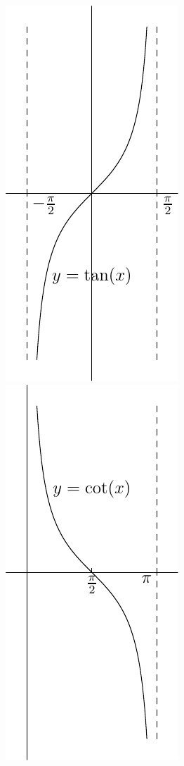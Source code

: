 \documentclass[UTTF8, fontset=ubuntu]{ctexart}
\begin{document}
\begin{figure}
\centering
\includegraphics{tan.pdf}\qquad\includegraphics{cot.pdf}
\end{figure}
\end{document}
